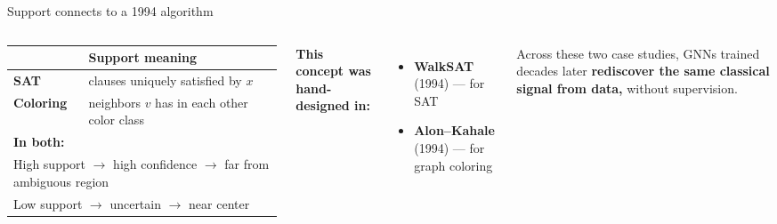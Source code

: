 \documentclass[aspectratio=169,10pt,dvipsnames]{beamer}
\begin{document}
\begin{frame}{Support connects to a 1994 algorithm}

\begin{columns}[T]
\small\renewcommand{\arraystretch}{1.3}
\begin{tabular}{@{}lp{4cm}@{}}
\toprule
& \textbf{Support meaning} \\
\midrule
\textbf{SAT} & clauses uniquely satisfied by $x$ \\
\textbf{Coloring} & neighbors $v$ has in each other color class \\
\midrule
\multicolumn{2}{l}{\small\textbf{In both:}} \\
\multicolumn{2}{l}{\small High support $\to$ high confidence $\to$ far from ambiguous region} \\
\multicolumn{2}{l}{\small Low support $\to$ uncertain $\to$ near center} \\
\bottomrule
\end{tabular}

\textbf{This concept was hand-designed in:}
\begin{itemize}
  \item \textbf{WalkSAT} (1994) — for SAT
  \item \textbf{Alon–Kahale} (1994) — for graph coloring
\end{itemize}

\bigskip
\begin{alertblock}{}
\small
Across these two case studies, GNNs trained decades later \textbf{rediscover the same classical signal from data,} without supervision.
\end{alertblock}
\end{columns}

\end{frame}
\end{document}
